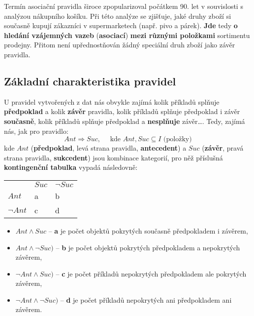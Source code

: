 Termín asociační pravidla široce zpopularizoval počátkem 90. let v souvislosti s analýzou nákupního košíku. Při této analýze se zjišťuje, jaké druhy zboží si současně kupují zákazníci v supermarketech (např. pivo a párek). \textbf{Jde} tedy \textbf{o hledání vzájemných vazeb} (\textbf{asociací}) \textbf{mezi různými položkami} sortimentu prodejny. Přitom není upřednostňován žádný speciální druh zboží jako závěr pravidla.

\subsection{Základní charakteristika pravidel}
U pravidel vytvořených z dat nás obvykle zajímá kolik příkladů splňuje \textbf{předpoklad} a kolik \textbf{závěr} pravidla, kolik příkladů splňuje předpoklad i závěr \textbf{současně}, kolik příkladů splňuje předpoklad a \textbf{nesplňuje} závěr…. Tedy, zajímá nás, jak pro pravidlo:
\begin{equation}
    Ant \Rightarrow Suc, \quad\textrm{ kde } Ant, Suc \subseteq I \textrm{ (položky)}
\end{equation}
kde $ Ant $ (\textbf{předpoklad}, levá strana pravidla, \textbf{antecedent}) a $ Suc $ (\textbf{závěr}, pravá strana pravidla, \textbf{sukcedent}) jsou kombinace kategorií, pro něž příslušná \textbf{kontingenční tabulka} vypadá následovně:
\begin{table}[H]
    \centering
    \begin{tabular}{l|ll}
                     & $ Suc $ & $ \neg Suc $ \\\hhline
        $ Ant $      & a       & b            \\
        $ \neg Ant $ & c       & d
    \end{tabular}
\end{table}
\begin{itemize}
    \item $Ant \land Suc$ -- \textbf{a} je počet objektů {pokrytých současně předpokladem i závěrem},
    \item $Ant \land \neg Suc)$ -- \textbf{b} je počet objektů {pokrytých předpokladem a nepokrytých závěrem},
    \item $\neg Ant \land Suc)$ -- \textbf{c} je počet příkladů {nepokrytých předpokladem ale pokrytých závěrem},
    \item $\neg Ant \land \neg Suc)$ -- \textbf{d} je počet příkladů {nepokrytých ani předpokladem ani závěrem}.
\end{itemize}

